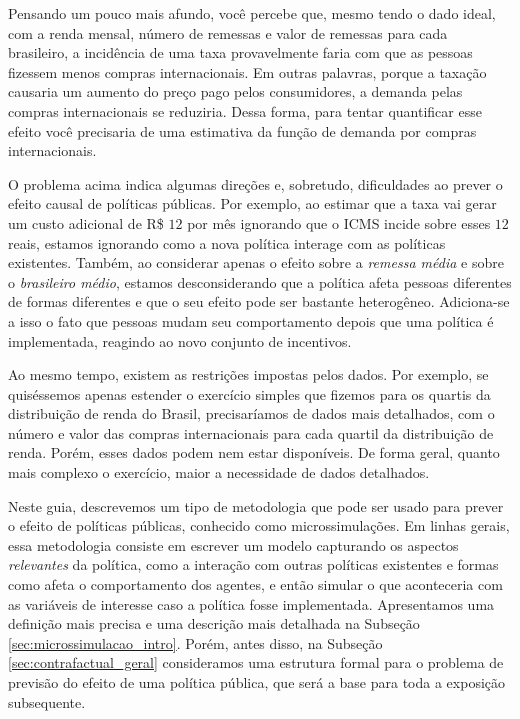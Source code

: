 \documentclass[12pt, a4paper, openany]{book}
\numberwithin{equation}{chapter}
\numberwithin{table}{chapter}
\numberwithin{figure}{chapter}
\theoremstyle{break}
\begin{document}
Pensando um pouco mais afundo, você percebe que, mesmo tendo o dado ideal, com a renda mensal, número de remessas e valor de remessas para cada brasileiro, a incidência de uma taxa provavelmente faria com que as pessoas fizessem menos compras internacionais. Em outras palavras, porque a taxação causaria um aumento do preço pago pelos consumidores, a demanda pelas compras internacionais se reduziria. Dessa forma, para tentar quantificar esse efeito você precisaria de uma estimativa da função de demanda por compras internacionais. 

\hfill\break

\noindent O problema acima indica algumas direções e, sobretudo, dificuldades ao prever o efeito causal de políticas públicas. Por exemplo, ao estimar que a taxa vai gerar um custo adicional de R\$ $12$ por mês ignorando que o ICMS incide sobre esses $12$ reais, estamos ignorando como a nova política interage com as políticas existentes. Também, ao considerar apenas o efeito sobre a \textit{remessa média} e sobre o \textit{brasileiro médio}, estamos desconsiderando que a política afeta pessoas diferentes de formas diferentes e que o seu efeito pode ser bastante heterogêneo. Adiciona-se a isso o fato que pessoas mudam seu comportamento depois que uma política é implementada, reagindo ao novo conjunto de incentivos. 

Ao mesmo tempo, existem as restrições impostas pelos dados. Por exemplo, se quiséssemos apenas estender o exercício simples que fizemos para os quartis da distribuição de renda do Brasil, precisaríamos de dados mais detalhados, com o número e valor das compras internacionais para cada quartil da distribuição de renda. Porém, esses dados podem nem estar disponíveis. De forma geral, quanto mais complexo o exercício, maior a necessidade de dados detalhados. 

Neste guia, descrevemos um tipo de metodologia que pode ser usado para prever o efeito de políticas públicas, conhecido como microssimulações. Em linhas gerais, essa metodologia consiste em escrever um modelo capturando os aspectos \textit{relevantes} da política, como a interação com outras políticas existentes e formas como afeta o comportamento dos agentes, e então simular o que aconteceria com as variáveis de interesse caso a política fosse implementada. Apresentamos uma definição mais precisa e uma descrição mais detalhada na Subseção \ref{sec:microssimulacao_intro}. Porém, antes disso, na Subseção \ref{sec:contrafactual_geral} consideramos uma estrutura formal para o problema de previsão do efeito de uma política pública, que será a base para toda a exposição subsequente.
\end{document}
